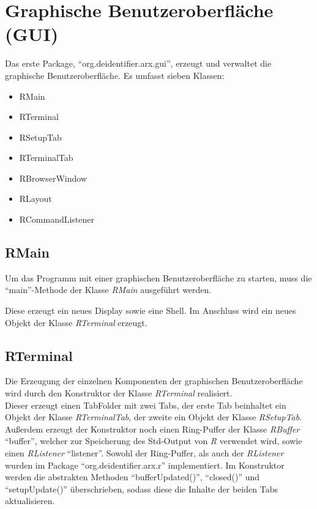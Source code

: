 \documentclass[a4paper, 12pt]{report} %
\begin{document}
\section{Graphische Benutzeroberfläche (GUI)}\label{gui}

\begin{samepage}

Das erste Package, "`org.deidentifier.arx.gui"', erzeugt und verwaltet die graphische Benutzeroberfläche. Es umfasst sieben Klassen:
\begin{itemize}
	\item RMain
	\item RTerminal
	\item RSetupTab
	\item RTerminalTab
	\item RBrowserWindow
	\item RLayout
	\item RCommandListener
\end{itemize}
\end{samepage}

\subsection{RMain}

Um das Programm mit einer graphischen Benutzeroberfläche zu starten, muss die "`main"'-Methode der Klasse \textit{RMain} ausgeführt werden. 

Diese erzeugt ein neues Display sowie eine Shell. Im Anschluss wird ein neues Objekt der Klasse \textit{RTerminal} erzeugt.

\subsection{RTerminal}

Die Erzeugung der einzelnen Komponenten der graphischen Benutzeroberfläche wird durch den Konstruktor der Klasse \textit{RTerminal} realisiert.\\

Dieser erzeugt einen TabFolder mit zwei Tabs, der erste Tab beinhaltet ein Objekt der Klasse \textit{RTerminalTab}, der zweite ein Objekt der Klasse \textit{RSetupTab}.
Außerdem erzeugt der Konstruktor noch einen Ring-Puffer der Klasse \textit{RBuffer} "`buffer"', welcher zur Speicherung des Std-Output von \textit{R} verwendet wird, sowie einen \textit{RListener} "`listener"'. Sowohl der Ring-Puffer, als auch der \textit{RListener} wurden im Package "`org.deidentifier.arx.r"' implementiert.
Im Konstruktor werden die abstrakten Methoden "`bufferUpdated()"', "`closed()"' und "`setupUpdate()"' überschrieben, sodass diese die Inhalte der beiden Tabs aktualisieren.\\
\end{document}
